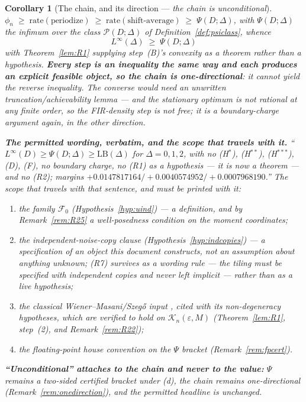 \documentclass[11pt]{article}
\newtheorem{corollary}{Corollary}
\theoremstyle{definition}
\theoremstyle{remark}
\begin{document}
\begin{corollary}[The chain, and its direction --- \emph{the chain is
unconditional}]
\label{cor:onedir}
$\phi_n\;\ge\;\mathrm{rate}(\text{periodize})\;\ge\;
\mathrm{rate}(\text{shift-average})\;\ge\;\Psi(D;\Delta)$, with
$\Psi(D;\Delta)$ the infimum over the class $\mathcal P(D;\Delta)$ of
Definition~\ref{def:psiclass}, whence
\[
\boxed{\;L^\infty(\Delta)\;\ge\;\Psi(D;\Delta)\;}
\]
with Theorem~\ref{lem:R1} supplying step~(B)'s convexity as a
\emph{theorem} rather than a hypothesis.
\textbf{Every step is an inequality the same way and each produces an
explicit feasible object, so the chain is one-directional}: it cannot
yield the reverse inequality. The converse would need an unwritten
truncation/achievability lemma --- and the stationary optimum is not
rational at any finite order, so the FIR-density step is not free; it
is a boundary-charge argument again, in the other direction.

\medskip\noindent\textbf{The permitted wording, verbatim, and the scope
that travels with it.}
\emph{``$L^\infty(D)\ge\Psi(D;\Delta)\ge\mathrm{LB}(\Delta)$ for
$\Delta=0,1,2$, with no {\rm(H$^\ast$)}, {\rm(H$^{\ast\ast}$)},
{\rm(H$^{\ast\ast\ast}$)}, {\rm(D)}, {\rm(F)}, no boundary charge, no
{\rm(R1)} as a hypothesis --- it is now a theorem --- and no
{\rm(R2)}; margins $+0.0147817164/+0.0040574952/+0.0007968190$.''}
The scope that travels with that sentence, and must be printed with it:
\begin{enumerate}
\item[(a)] the family $\mathcal F_0$ (Hypothesis~\ref{hyp:uind}) ---
a \emph{definition}, and by Remark~\ref{rem:R25} a
\emph{well-posedness condition} on the moment coordinates;
\item[(b)] the independent-noise-copy clause
(Hypothesis~\ref{hyp:indcopies}) --- a \emph{specification of an object
this document constructs}, not an assumption about anything unknown;
(R7) survives as a \emph{wording rule} --- the tiling must be
specified with independent copies and never left implicit --- rather
than as a live hypothesis;
\item[(c)] the classical Wiener--Masani/Szeg\H o input
\cite{bib:wm57,bib:wm58,bib:hl58}, cited
\emph{with} its non-degeneracy hypotheses, which are verified to hold
on $\mathcal K_n(\varepsilon,M)$ (Theorem~\ref{lem:R1}, step~(2), and
Remark~\ref{rem:R22});
\item[(d)] the floating-point house convention on the $\Psi$ bracket
(Remark~\ref{rem:fpcert}).
\end{enumerate}
\textbf{``Unconditional'' attaches to the chain and never to the
value:} $\Psi$ remains a two-sided \emph{certified bracket} under (d),
the chain remains one-directional (Remark~\ref{rem:onedirection}), and
the permitted headline is unchanged.
\end{corollary}
\end{document}
